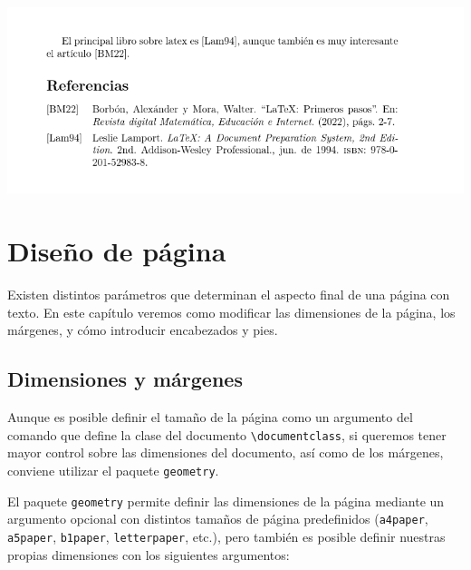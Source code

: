 \documentclass[
  a4paper,
]{scrreport}
\begin{document}
\begin{tcolorbox}[enhanced jigsaw, bottomrule=.15mm, leftrule=.75mm, opacityback=0, titlerule=0mm, bottomtitle=1mm, colbacktitle=quarto-callout-note-color!10!white, arc=.35mm, toprule=.15mm, colframe=quarto-callout-note-color-frame, title={Salida}, coltitle=black, colback=white, breakable, toptitle=1mm, rightrule=.15mm, left=2mm, opacitybacktitle=0.6]

\includegraphics{./img/bibliografia/bibliografia2.png}

\end{tcolorbox}


\hypertarget{diseuxf1o-de-puxe1gina}{%
\chapter{Diseño de página}\label{diseuxf1o-de-puxe1gina}}

Existen distintos parámetros que determinan el aspecto final de una
página con texto. En este capítulo veremos como modificar las
dimensiones de la página, los márgenes, y cómo introducir encabezados y
pies.

\hypertarget{dimensiones-y-muxe1rgenes}{%
\section{Dimensiones y márgenes}\label{dimensiones-y-muxe1rgenes}}

Aunque es posible definir el tamaño de la página como un argumento del
comando que define la clase del documento
\texttt{\textbackslash{}documentclass}, si queremos tener mayor control
sobre las dimensiones del documento, así como de los márgenes, conviene
utilizar el paquete \texttt{geometry}.

El paquete \texttt{geometry} permite definir las dimensiones de la
página mediante un argumento opcional con distintos tamaños de página
predefinidos (\texttt{a4paper}, \texttt{a5paper}, \texttt{b1paper},
\texttt{letterpaper}, etc.), pero también es posible definir nuestras
propias dimensiones con los siguientes argumentos:
\end{document}
